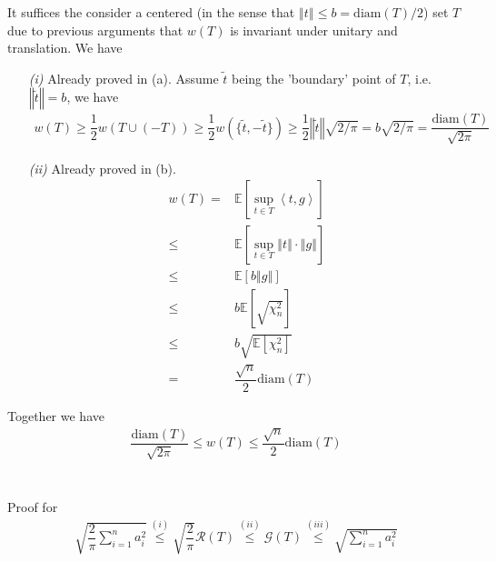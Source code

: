 \documentclass[11pt,a4paper]{ctexart}
\numberwithin{equation}{section}%
\begin{document}
It suffices the consider a centered (in the sense that $ \left\Vert t  \right\Vert \leq b = \mathrm{ diam }(T)/2  $) set $ T $ due to previous arguments that $ w(T) $ is invariant under unitary and translation. We have
\begin{itemize}[topsep=2pt,itemsep=0pt]
    \item[\textit{(i)}] Already proved in (a). Assume $ \tilde{t} $ being the 'boundary' point of $ T $, i.e. $ \left\Vert \tilde{t} \right\Vert = b $, we have
    \begin{align*}
        w(T)\geq  \dfrac{ 1 }{ 2 } w(T\cup (-T)) \geq \dfrac{ 1 }{ 2 } w(\{\tilde{t}, -\tilde{t}\}) \geq \dfrac{ 1 }{ 2 } \left\Vert \tilde{t} \right\Vert \sqrt{2/\pi} = b\sqrt{2/\pi} = \dfrac{ \mathrm{diam }(T) }{ \sqrt{2\pi} } 
    \end{align*}
    
    \item[\textit{(ii)}] Already proved in (b).
    \begin{align*}
        w(T) =& \mathbb{E}\left[ \mathop{ \sup  }\limits_{t\in T } \left\langle t,g  \right\rangle  \right]\\
        \leq & \mathbb{E}\left[ \mathop{ \sup  }\limits_{t \in T } \left\Vert t  \right\Vert \cdot \left\Vert g  \right\Vert  \right] \\
        \leq & \mathbb{E}\left[  b \left\Vert g \right\Vert  \right] \\
        \leq & b \mathbb{E}\left[ \sqrt{\chi^2_n} \right] \\
        \leq &b\sqrt{\mathbb{E}\left[ \chi^2_n  \right] }\\
        = & \dfrac{ \sqrt{n} }{ 2 }  \mathrm{diam }(T)
    \end{align*}
    
        
    
    
\end{itemize}

Together we have
\begin{align*}
    \dfrac{ \mathrm{diam }(T) }{ \sqrt{2\pi} } \leq w(T) \leq \dfrac{ \sqrt{n} }{ 2 }  \mathrm{diam }(T) 
\end{align*}




\section{}

Proof for
\begin{align*}
    \sqrt{\dfrac{ 2 }{ \pi  } \sum_{i=1}^n a_i^2} \mathop{ \leq  }\limits^{(i)} \sqrt{\dfrac{ 2 }{ \pi  }}\mathcal{R}(T)\mathop{ \leq  }\limits^{(ii)} \mathcal{G}(T) \mathop{ \leq  }\limits^{(iii)} \sqrt{\sum_{i=1}^n a_i^2}   
\end{align*}
\end{document}
